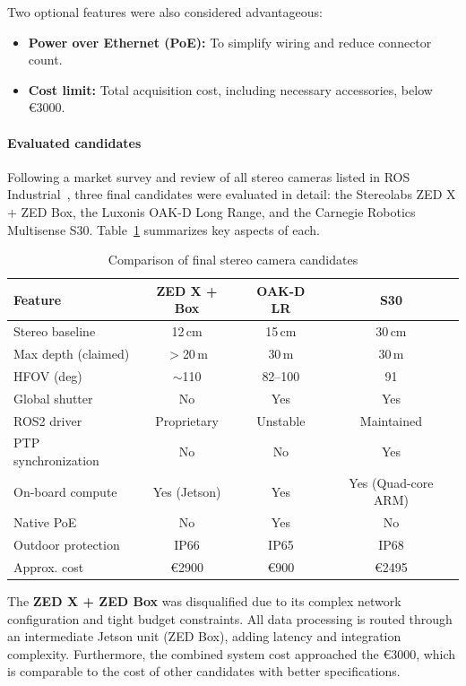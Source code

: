Two optional features were also considered advantageous:
\begin{itemize}
  \item \textbf{Power over Ethernet (PoE):} To simplify wiring and reduce connector count.
  \item \textbf{Cost limit:} Total acquisition cost, including necessary accessories, 
        below €3000.
\end{itemize}

\paragraph{Evaluated candidates}

Following a market survey and review of all stereo cameras listed in ROS Industrial~\cite{rosindustrialCameraSurvey}, 
three final candidates were evaluated in detail: the Stereolabs ZED X + ZED Box, 
the Luxonis OAK-D Long Range, and the Carnegie Robotics Multisense S30. 
Table~\ref{tab:candidate_summary} summarizes key aspects of each.

\begin{table}[H]
  \centering
  \begin{tabular}{lccc}
    \toprule
    \textbf{Feature} & \textbf{ZED X + Box} & \textbf{OAK-D LR} & \textbf{S30} \\
    \midrule
    Stereo baseline & 12\,cm & 15\,cm & 30\,cm \\
    Max depth (claimed) & $>$20\,m & 30\,m & 30\,m \\
    HFOV (deg) & $\sim$110 & 82--100 & 91 \\
    Global shutter & No & Yes & Yes \\
    ROS2 driver & Proprietary & Unstable & Maintained \\
    PTP synchronization & No & No & Yes \\
    On-board compute & Yes (Jetson) & Yes & Yes (Quad-core ARM) \\
    Native PoE & No & Yes & No  \\
    Outdoor protection & IP66 & IP65 & IP68 \\
    Approx. cost & €2900 & €900 & €2495 \\
    \bottomrule
  \end{tabular}
  \caption{Comparison of final stereo camera candidates}
  \label{tab:candidate_summary}
\end{table}

The \textbf{ZED X + ZED Box} was disqualified due to its complex network configuration 
and tight budget constraints. All data processing is routed through an intermediate Jetson 
unit (ZED Box), adding latency and integration complexity. Furthermore, the combined system 
cost approached the €3000, which is comparable to the cost of other candidates with better 
specifications.

